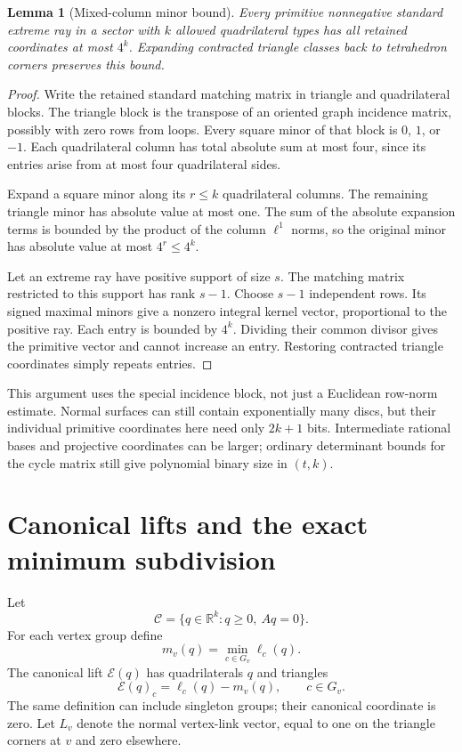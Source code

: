 \documentclass[11pt]{article}
\newtheorem{lemma}[theorem]{Lemma}
\theoremstyle{definition}
\theoremstyle{remark}
\newcommand{\R}{\mathbb R}\newcommand{\Q}{\mathbb Q}
\newcommand{\cone}{\mathcal C}\newcommand{\stdcone}{\mathcal K}
\newcommand{\lift}{\mathcal E}\newcommand{\poly}{\operatorname{poly}}
\begin{document}
\begin{lemma}[Mixed-column minor bound]
\label{lem:height}
Every primitive nonnegative standard extreme ray in a sector with $k$ allowed
quadrilateral types has all retained coordinates at most $4^k$. Expanding
contracted triangle classes back to tetrahedron corners preserves this bound.
\end{lemma}

\begin{proof}
Write the retained standard matching matrix in triangle and quadrilateral
blocks. The triangle block is the transpose of an oriented graph incidence
matrix, possibly with zero rows from loops. Every square minor of that block
is $0$, $1$, or $-1$. Each quadrilateral column has total absolute sum at most
four, since its entries arise from at most four quadrilateral sides.

Expand a square minor along its $r\le k$ quadrilateral columns. The remaining
triangle minor has absolute value at most one. The sum of the absolute
expansion terms is bounded by the product of the column $\ell^1$ norms, so
the original minor has absolute value at most $4^r\le4^k$.

Let an extreme ray have positive support of size $s$. The matching matrix
restricted to this support has rank $s-1$. Choose $s-1$ independent rows.
Its signed maximal minors give a nonzero integral kernel vector, proportional
to the positive ray. Each entry is bounded by $4^k$. Dividing their common
divisor gives the primitive vector and cannot increase an entry. Restoring
contracted triangle coordinates simply repeats entries.
\end{proof}

This argument uses the special incidence block, not just a Euclidean row-norm
estimate. Normal surfaces can still contain exponentially many discs, but
their individual primitive coordinates here need only $2k+1$ bits. Intermediate
rational bases and projective coordinates can be larger; ordinary determinant
bounds for the cycle matrix still give polynomial binary size in $(t,k)$.

\section{Canonical lifts and the exact minimum subdivision}
\label{sec:fan}

Let
\begin{equation}
 \cone=\{q\in\R^k:q\ge0,\ Aq=0\}.
 \label{eq:qcone}
\end{equation}
For each vertex group define
\begin{equation}
 m_v(q)=\min_{c\in G_v}\ell_c(q).
 \label{eq:minimum}
\end{equation}
The canonical lift $\lift(q)$ has quadrilaterals $q$ and triangles
\begin{equation}
 \lift(q)_c=\ell_c(q)-m_v(q),\qquad c\in G_v.
 \label{eq:canonical}
\end{equation}
The same definition can include singleton groups; their canonical coordinate
is zero. Let $L_v$ denote the normal vertex-link vector, equal to one on the
triangle corners at $v$ and zero elsewhere.
\end{document}
